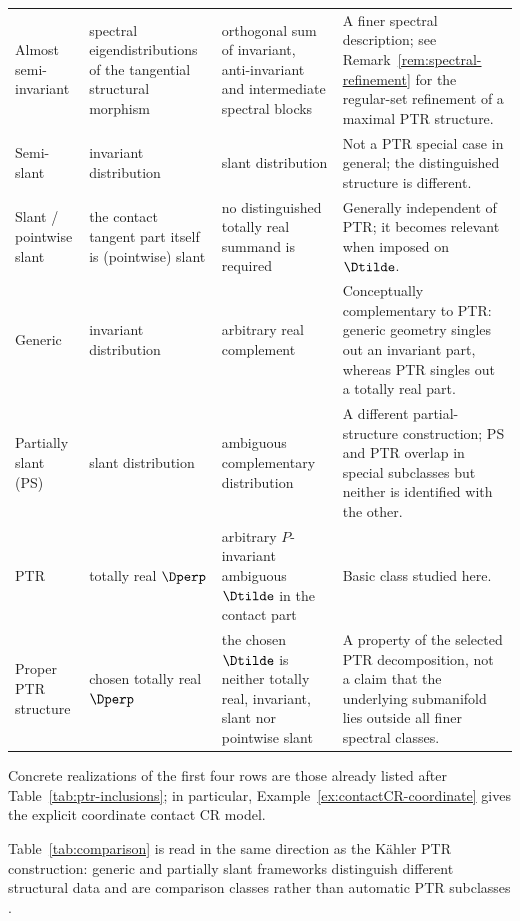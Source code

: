 \documentclass[11pt]{article}
\theoremstyle{definition}\newtheorem{definition}[theorem]{Definition}\newtheorem{example}[theorem]{Example}
\theoremstyle{remark}\newtheorem{remark}[theorem]{Remark}
\begin{document}
\begin{table}[htbp]
\begin{tabularx}{\textwidth}{@{}>{\raggedright\arraybackslash}p{2.45cm}>{\raggedright\arraybackslash}X>{\raggedright\arraybackslash}X>{\raggedright\arraybackslash}X@{}}
Almost semi-invariant & spectral eigendistributions of the tangential structural morphism & orthogonal sum of invariant, anti-invariant and intermediate spectral blocks & A finer spectral description; see Remark~\ref{rem:spectral-refinement} for the regular-set refinement of a maximal PTR structure. \\
Semi-slant & invariant distribution & slant distribution & Not a PTR special case in general; the distinguished structure is different. \\
Slant / pointwise slant & the contact tangent part itself is (pointwise) slant & no distinguished totally real summand is required & Generally independent of PTR; it becomes relevant when imposed on $\Dtilde$. \\
Generic & invariant distribution & arbitrary real complement & Conceptually complementary to PTR: generic geometry singles out an invariant part, whereas PTR singles out a totally real part. \\
Partially slant (PS) & slant distribution & ambiguous complementary distribution & A different partial-structure construction; PS and PTR overlap in special subclasses but neither is identified with the other. \\
PTR & totally real $\Dperp$ & arbitrary $P$-invariant ambiguous $\Dtilde$ in the contact part & Basic class studied here. \\
Proper PTR structure & chosen totally real $\Dperp$ & the chosen $\Dtilde$ is neither totally real, invariant, slant nor pointwise slant & A property of the selected PTR decomposition, not a claim that the underlying submanifold lies outside all finer spectral classes. \\
\bottomrule
\end{tabularx}
\end{table}

Concrete realizations of the first four rows are those already listed
after Table~\ref{tab:ptr-inclusions}; in particular,
Example~\ref{ex:contactCR-coordinate} gives the explicit coordinate
contact CR model.


Table~\ref{tab:comparison} is read in the same direction as the K\"ahler
PTR construction: generic and partially slant frameworks distinguish
different structural data and are comparison classes rather than
automatic PTR subclasses
\cite{PoyrazSahinYerlikaya2025,YerlikayaPoyrazSahin2025}.
\end{document}
